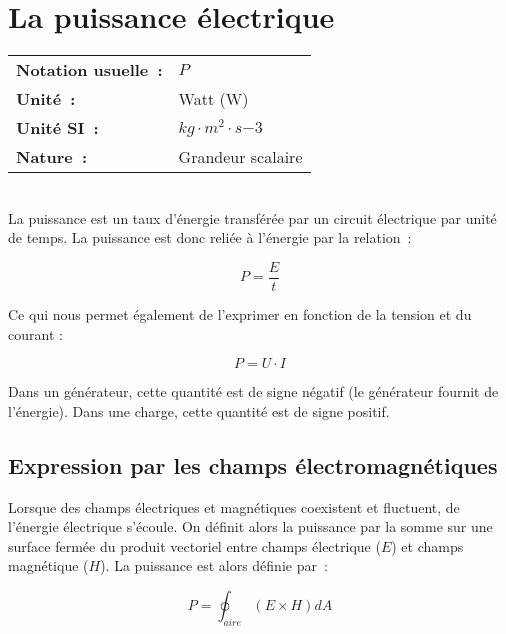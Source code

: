 \section{La puissance électrique}

\begin{tabular}{ll}
\textbf{Notation usuelle~:} & $P$ \\
\textbf{Unité~:} & Watt (W) \\
	\textbf{Unité SI~:} & $kg \cdot m^2 \cdot s{-3}$ \\
\textbf{Nature~:} & Grandeur scalaire \\
\end{tabular} \\

La puissance est un taux d'énergie transférée par un circuit électrique par unité de temps. La puissance est donc reliée à l'énergie par la relation~:

\begin{equation}
	P = \dfrac{E}{t}
\end{equation}

Ce qui nous permet également de l'exprimer en fonction de la tension et du courant :

\begin{equation}
	P = U \cdot I
\end{equation}

Dans un générateur, cette quantité est de signe négatif (le générateur fournit de l'énergie). Dans une charge, cette quantité est de signe positif.

\subsection{Expression par les champs électromagnétiques}

Lorsque des champs électriques et magnétiques coexistent et fluctuent, de l'énergie électrique s'écoule. On définit alors la puissance par la somme sur une surface fermée du produit vectoriel entre champs électrique ($E$) et champs magnétique ($H$). La puissance est alors définie par~:

\begin{equation}
P = \oint_{aire}(E \times H) d{A}
\end{equation}

